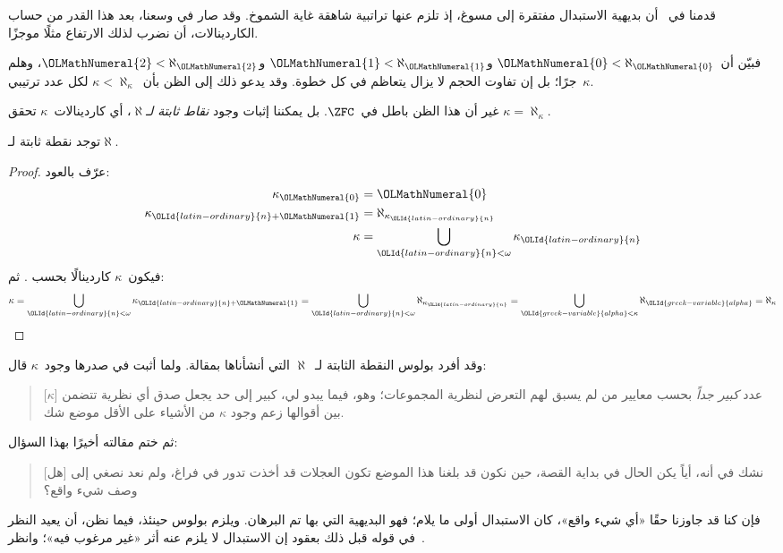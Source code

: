 \documentclass[../../../include/open-logic-section]{subfiles}
\begin{document}

قدمنا في~ أن بديهية الاستبدال مفتقرة إلى مسوغ،
إذ تلزم عنها تراتبية شاهقة غاية الشموخ. وقد صار في وسعنا، بعد هذا القدر
من حساب الكاردينالات، أن نضرب لذلك الارتفاع مثلًا موجزًا.

فبيّن أن~${\OLMathNumeral{0}} < \aleph_{\OLMathNumeral{0}}$ و${\OLMathNumeral{1}} < \aleph_{\OLMathNumeral{1}}$ و${\OLMathNumeral{2}} < \aleph_{\OLMathNumeral{2}}$، وهلم
جرًا؛ بل إن تفاوت الحجم لا يزال يتعاظم في كل خطوة. وقد يدعو ذلك إلى
الظن بأن~$\kappa< \aleph_\kappa$ لكل عدد ترتيبي~$\kappa$.

غير أن هذا الظن باطل في~$\ZFC$. بل يمكننا إثبات وجود
\emph{نقاط ثابتة لـ$\aleph$}، أي كاردينالات~$\kappa$ تحقق
$\kappa=\aleph_\kappa$.

\begin{prop}
توجد نقطة ثابتة لـ$\aleph$.
\end{prop}

\begin{proof}
عرّف بالعود:
\begin{align*}
	\kappa_{\OLMathNumeral{0}} &= {\OLMathNumeral{0}}\\
	\kappa_{{\OLId{latin-ordinary}{n}}+{\OLMathNumeral{1}}} &= \aleph_{\kappa_{\OLId{latin-ordinary}{n}}}\\
	\kappa&= \bigcup_{{\OLId{latin-ordinary}{n}} < \omega}\kappa_{\OLId{latin-ordinary}{n}}
\end{align*}
فيكون~$\kappa$ كاردينالًا بحسب
. ثم:
\[
	\kappa= \bigcup_{{\OLId{latin-ordinary}{n}} < \omega} \kappa_{{\OLId{latin-ordinary}{n}}+{\OLMathNumeral{1}}} =
	\bigcup_{{\OLId{latin-ordinary}{n}} < \omega}\aleph_{\kappa_{\OLId{latin-ordinary}{n}}} =
	\bigcup_{{\OLId{greek-variable}{alpha}} < \kappa}\aleph_{\OLId{greek-variable}{alpha}} = \aleph_\kappa
\]
\end{proof}

وقد أفرد بولوس النقطة الثابتة لـ~$\aleph$ التي أنشأناها بمقالة. ولما
أثبت في صدرها وجود~$\kappa$ قال:
\begin{quote}
	[$\kappa$] عدد \emph{كبير جداً} بحسب معايير من لم يسبق لهم التعرض
	لنظرية المجموعات؛ وهو، فيما يبدو لي، كبير إلى حد يجعل صدق أي نظرية
	تتضمن بين أقوالها زعم وجود $\kappa$ من الأشياء على الأقل موضع شك.
	\citep[p.~257]{Boolos2000}
\end{quote}
ثم ختم مقالته أخيرًا بهذا السؤال:
\begin{quote}
	[هل] نشك في أنه، أياً يكن الحال في بداية القصة، حين نكون قد بلغنا هذا
	الموضع تكون العجلات قد أخذت تدور في فراغ، ولم نعد نصغي إلى وصف شيء
	واقع؟
	\citep[p.~268]{Boolos2000}
\end{quote}
فإن كنا قد جاوزنا حقًا «أي شيء واقع»، كان الاستبدال أولى ما يلام؛ فهو
البديهية التي بها تم البرهان. ويلزم بولوس حينئذ، فيما نظن، أن يعيد النظر
في قوله قبل ذلك بعقود إن الاستبدال لا يلزم عنه أثر «غير مرغوب فيه»؛
وانظر~.
\end{document}
